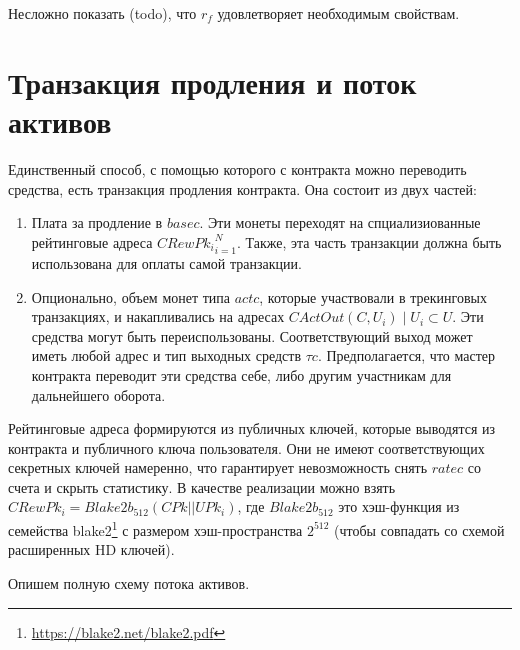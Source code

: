 \documentclass[specification,annotation]{itmo-student-thesis}
\begin{document}
Несложно показать (todo), что $r_f$ удовлетворяет необходимым свойствам.

\section{Транзакция продления и поток активов}

Единственный способ, с помощью которого с контракта можно переводить
средства, есть транзакция продления контракта. Она состоит из двух
частей:

\begin{enumerate}
\item Плата за продление в $basec$. Эти монеты переходят на
  спциализиованные рейтинговые адреса ${CRewPk_i}_{i=1}^N$. Также, эта часть
  транзакции должна быть использована для оплаты самой транзакции.
\item Опционально, объем монет типа $actc$, которые участвовали в
  трекинговых транзакциях, и накапливались на адресах
  $CActOut(C,U_i) \mid U_i \subset U$. Эти средства могут быть
  переиспользованы. Соответствующий выход может иметь любой адрес и
  тип выходных средств $\tau c$. Предполагается, что мастер контракта
  переводит эти средства себе, либо другим участникам для дальнейшего
  оборота.
\end{enumerate}

Рейтинговые адреса формируются из публичных ключей, которые выводятся
из контракта и публичного ключа пользователя. Они не имеют
соответствующих секретных ключей намеренно, что гарантирует
невозможность снять $ratec$ со счета и скрыть статистику. В качестве
реализации можно взять $CRewPk_i = Blake2b_{512}(CPk || UPk_i)$, где
$Blake2b_{512}$ это хэш-функция из семейства
blake2\footnote{\url{https://blake2.net/blake2.pdf}} с размером
хэш-пространства $2^{512}$ (чтобы совпадать со схемой расширенных HD
ключей).

Опишем полную схему потока активов.
\end{document}
